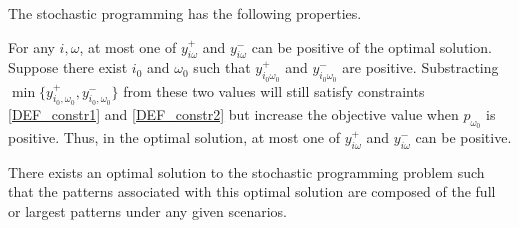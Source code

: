 
The stochastic programming has the following properties.

For any $i, \omega$, at most one of $y_{i \omega}^{+}$ and $y_{i \omega}^{-}$ can be positive of the optimal solution. Suppose there exist $i_0$ and $\omega_0$ such that $y_{i_0 \omega_0}^{+}$ and $y_{i_0 \omega_0}^{-}$ are positive. Substracting $\min\{y_{i_0, \omega_0}^{+}, y_{i_0, \omega_0}^{-}\}$ from these two values will still satisfy constraints \eqref{DEF_constr1} and \eqref{DEF_constr2} but increase the objective value when $p_{\omega_0}$ is positive. Thus, in the optimal solution, at most one of $y_{i \omega}^{+}$ and $y_{i \omega}^{-}$ can be positive.



\begin{prop}\label{prop_solution}
There exists an optimal solution to the stochastic programming problem such that the patterns associated with this optimal solution are composed of the full or largest patterns under any given scenarios.
\end{prop}

